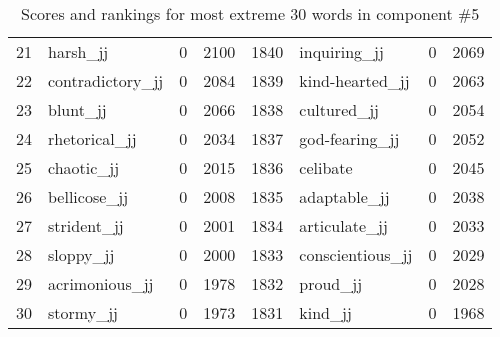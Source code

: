 \begin{table}[tbp]
\begin{tabular}{| rlr@{.}l | rlr@{.}l |}
    21 & harsh\_jj & 0 & 2100    &    1840 & inquiring\_jj & 0 & 2069 \\
    22 & contradictory\_jj & 0 & 2084    &    1839 & kind-hearted\_jj & 0 & 2063 \\
    23 & blunt\_jj & 0 & 2066    &    1838 & cultured\_jj & 0 & 2054 \\
    24 & rhetorical\_jj & 0 & 2034    &    1837 & god-fearing\_jj & 0 & 2052 \\
    25 & chaotic\_jj & 0 & 2015    &    1836 & celibate & 0 & 2045 \\
    26 & bellicose\_jj & 0 & 2008    &    1835 & adaptable\_jj & 0 & 2038 \\
    27 & strident\_jj & 0 & 2001    &    1834 & articulate\_jj & 0 & 2033 \\
    28 & sloppy\_jj & 0 & 2000    &    1833 & conscientious\_jj & 0 & 2029 \\
    29 & acrimonious\_jj & 0 & 1978    &    1832 & proud\_jj & 0 & 2028 \\
    30 & stormy\_jj & 0 & 1973    &    1831 & kind\_jj & 0 & 1968 \\
    \hline
    \end{tabular}
    \caption{Scores and rankings for most extreme 30 words in component \#5} 
\end{table}
\clearpage
